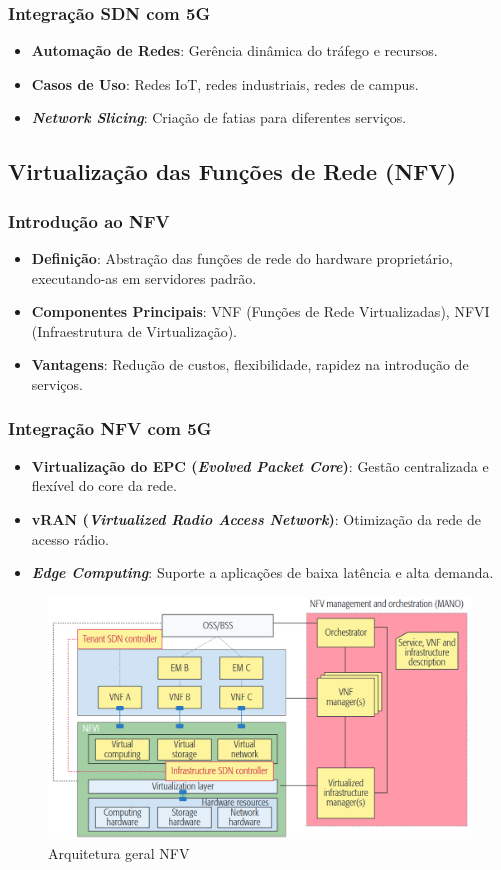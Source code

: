 \begin{frame}
    \frametitle{Integração SDN com 5G}
    \begin{itemize}
        \item \textbf{Automação de Redes}: Gerência dinâmica do tráfego e recursos.
        \item \textbf{Casos de Uso}: Redes IoT, redes industriais, redes de campus.
        \item \textbf{\textit{Network Slicing}}: Criação de fatias para diferentes serviços.
    \end{itemize}
\end{frame}

\subsection{Virtualização das Funções de Rede (NFV)}
\begin{frame}
    \frametitle{Introdução ao NFV}
    \begin{itemize}
        \item \textbf{Definição}: Abstração das funções de rede do hardware proprietário, executando-as em servidores padrão.
        \item \textbf{Componentes Principais}: VNF (Funções de Rede Virtualizadas), NFVI (Infraestrutura de Virtualização).
        \item \textbf{Vantagens}: Redução de custos, flexibilidade, rapidez na introdução de serviços.
    \end{itemize}
\end{frame}

\begin{frame}
    \frametitle{Integração NFV com 5G}
    \begin{itemize}
        \item \textbf{Virtualização do EPC (\textit{Evolved Packet Core})}: Gestão centralizada e flexível do core da rede.
        \item \textbf{vRAN (\textit{Virtualized Radio Access Network})}: Otimização da rede de acesso rádio.
        \item \textbf{\textit{Edge Computing}}: Suporte a aplicações de baixa latência e alta demanda.
    \end{itemize}
    \begin{figure}
        \centering
        \includegraphics[width=0.6\linewidth]{figs/ArquiteturaNFV.png}
        \caption{Arquitetura geral NFV}
    \end{figure}
\end{frame}

